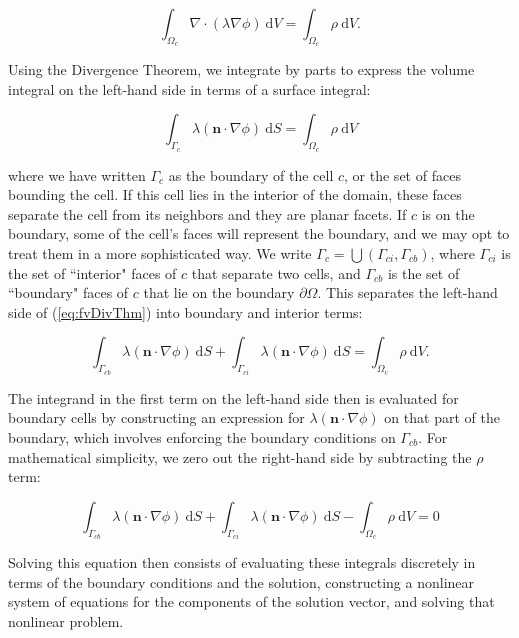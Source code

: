 \documentclass[12pt]{article}
\newcommand{\labelEq}[1]{\label{eq:#1}}
\newcommand{\refEq}[1]{(\ref{eq:#1})}
\renewcommand{\vec}[1]{\mathbf{#1}}
\newcommand{\diverg}[1]{\nabla\cdot#1}
\newcommand{\grad}[1]{\nabla#1}
\newcommand{\dV}{~\mathrm{d}V}
\newcommand{\dS}{~\mathrm{d}S}
\begin{document}
\begin{equation}
\int_{\Omega_c} \diverg(\lambda \grad{\phi}) \dV = \int_{\Omega_c} \rho \dV.
\end{equation}

Using the Divergence Theorem, we integrate by parts to express the volume 
integral on the left-hand side in terms of a surface integral:

\begin{equation}
\int_{\Gamma_c} \lambda (\vec{n}\cdot\grad{\phi}) \dS = \int_{\Omega_c} \rho \dV \labelEq{fvDivThm}
\end{equation}

\noindent
where we have written $\Gamma_c$ as the boundary of the cell $c$, or the set 
of faces bounding the cell. If this cell lies in the interior of the domain, 
these faces separate the cell from its neighbors and they are planar facets. 
If $c$ is on the boundary, some of the cell's faces will represent the boundary, 
and we may opt to treat them in a more sophisticated way. We write 
$\Gamma_c = \bigcup(\Gamma_{ci}, \Gamma_{cb})$, where $\Gamma_{ci}$ is the set of 
``interior" faces of $c$ that separate two cells, and $\Gamma_{cb}$ is the set
of ``boundary" faces of $c$ that lie on the boundary $\partial\Omega$. This separates 
the left-hand side of \refEq{fvDivThm} into boundary and interior terms:

\begin{equation}
\int_{\Gamma_{cb}} \lambda (\vec{n}\cdot\grad{\phi}) \dS + 
\int_{\Gamma_{ci}} \lambda (\vec{n}\cdot\grad{\phi}) \dS = \int_{\Omega_c} \rho \dV. 
\end{equation}

\noindent
The integrand in the first term on the left-hand side then is evaluated for 
boundary cells by constructing an expression for $\lambda (\vec{n}\cdot\grad{\phi})$ on that 
part of the boundary, which involves enforcing the boundary conditions on $\Gamma_{cb}$. For mathematical
simplicity, we zero out the right-hand side by subtracting the $\rho$ term:

\begin{equation}
\int_{\Gamma_{cb}} \lambda (\vec{n}\cdot\grad{\phi}) \dS + 
\int_{\Gamma_{ci}} \lambda (\vec{n}\cdot\grad{\phi}) \dS - \int_{\Omega_c} \rho \dV = 0 \labelEq{fvContEq}
\end{equation}

\noindent
Solving this equation then consists of evaluating these integrals discretely in terms of the 
boundary conditions and the solution, constructing a nonlinear system of equations for 
the components of the solution vector, and solving that nonlinear problem.
\end{document}
